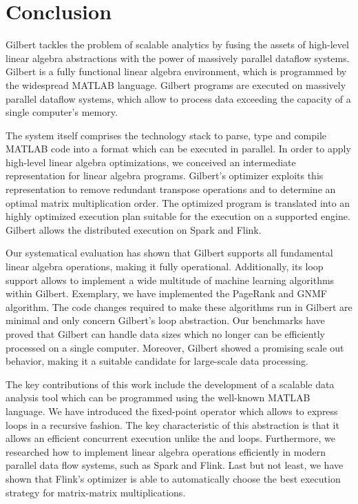 \section{Conclusion}
\label{sec:conclusion}

Gilbert tackles the problem of scalable analytics by fusing the assets of high-level linear algebra abstractions with the power of massively parallel dataflow systems.
Gilbert is a fully functional linear algebra environment, which is programmed by the widespread MATLAB language.
Gilbert programs are executed on massively parallel dataflow systems, which allow to process data exceeding the capacity of a single computer's memory.

The system itself comprises the technology stack to parse, type and compile MATLAB code into a format which can be executed in parallel.
In order to apply high-level linear algebra optimizations, we conceived an intermediate representation for linear algebra programs.
Gilbert's optimizer exploits this representation to remove redundant transpose operations and to determine an optimal matrix multiplication order.
The optimized program is translated into an highly optimized execution plan suitable for the execution on a supported engine.
Gilbert allows the distributed execution on Spark and Flink.

Our systematical evaluation has shown that Gilbert supports all fundamental linear algebra operations, making it fully operational.
Additionally, its loop support allows to implement a wide multitude of machine learning algorithms within Gilbert.
Exemplary, we have implemented the PageRank and GNMF algorithm.
The code changes required to make these algorithms run in Gilbert are minimal and only concern Gilbert's loop abstraction.
Our benchmarks have proved that Gilbert can handle data sizes which no longer can be efficiently processed on a single computer.
Moreover, Gilbert showed a promising scale out behavior, making it a suitable candidate for large-scale data processing.

The key contributions of this work include the development of a scalable data analysis tool which can be programmed using the well-known MATLAB language.
We have introduced the fixed-point operator which allows to express loops in a recursive fashion.
The key characteristic of this abstraction is that it allows an efficient concurrent execution unlike the  and  loops.
Furthermore, we researched how to implement linear algebra operations efficiently in modern parallel data flow systems, such as Spark and Flink.
Last but not least, we have shown that Flink's optimizer is able to automatically choose the best execution strategy for matrix-matrix multiplications.

